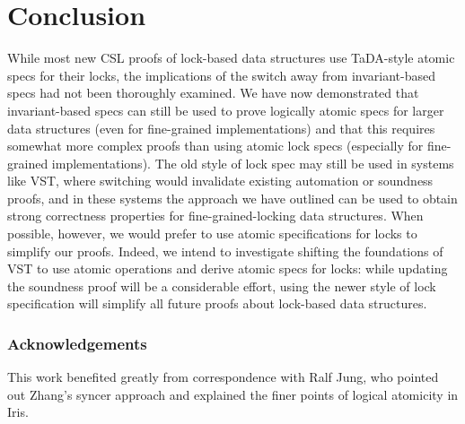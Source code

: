 \documentclass[runningheads]{llncs}
\begin{document}


\section{Conclusion}
\label{conclusion}
While most new CSL proofs of lock-based data structures use TaDA-style atomic specs for their locks, the implications of the switch away from invariant-based specs had not been thoroughly examined. We have now demonstrated that invariant-based specs can still be used to prove logically atomic specs for larger data structures (even for fine-grained implementations) and that this requires somewhat more complex proofs than using atomic lock specs (especially for fine-grained implementations). The old style of lock spec may still be used in systems like VST, where switching would invalidate existing automation or soundness proofs, and in these systems the approach we have outlined can be used to obtain strong correctness properties for fine-grained-locking data structures. When possible, however, we would prefer to use atomic specifications for locks to simplify our proofs. Indeed, we intend to investigate shifting the foundations of VST to use atomic operations and derive atomic specs for locks: while updating the soundness proof will be a considerable effort, using the newer style of lock specification will simplify all future proofs about lock-based data structures.

\subsubsection{Acknowledgements} This work benefited greatly from correspondence with Ralf Jung, who pointed out Zhang's syncer approach and explained the finer points of logical atomicity in Iris.


\end{document}

